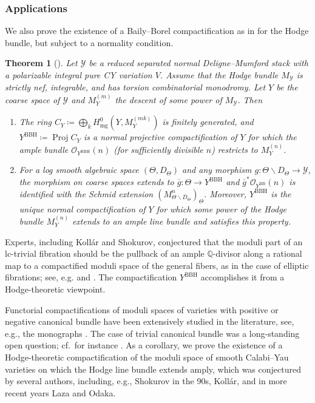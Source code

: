 \documentclass{amsart}
\newcommand{\bs}{\backslash}
\newcommand{\proj}{\operatorname{Proj}}
\newcommand{\ol}{\overline}
\newtheorem{thm}[theorem]{Theorem}
\theoremstyle{definition}
\theoremstyle{remark}
\def\bQ{\mathbb{Q}}
\def\cO{\mathcal{O}}
\def\cY{\mathcal{Y}}
\def\BB{\mathrm{BB}}
\def\bdd{\mathrm{mg}}
\renewcommand{\bar}[1]{\ol{#1}}
\def\BBH{\mathrm{BBH}}
\numberwithin{equation}{section}
\def\testsp{\Theta}
\begin{document}
\subsubsection{Applications}

We also prove the existence of a Baily--Borel compactification as in  for the Hodge bundle, but subject to a normality condition.



\begin{thm}[]\label{thm:BBHodgemain}
Let $\cY$ be a reduced separated normal Deligne--Mumford stack with a polarizable integral pure CY variation $V$.  Assume that the Hodge bundle $M_\cY$ is strictly nef, integrable, and has torsion combinatorial monodromy.  Let $Y$ be the coarse space of $\cY$ and $M_Y^{(m)}$ the descent of some power of $M_\cY$.    Then

\begin{enumerate}
\item The ring $C_Y\coloneqq  \bigoplus_k H^0_{\bdd}(Y,M^{(mk)}_Y)$ is finitely generated, and $Y^{\BBH}\coloneqq  \proj C_Y$ is a normal projective compactification of $Y$ for which the ample bundle $\cO_{Y^\BBH}(n)$ (for sufficiently divisible $n$) restricts to $M_Y^{(n)}$.
\item For a log smooth algebraic space $(\testsp,D_\testsp)$ and any morphism $g:\testsp\bs D_\testsp\to \cY$, the morphism on coarse spaces extends to $\bar g:\testsp\to Y^\BBH$ and $\bar g^*\cO_{Y^\BB}(n)$ is identified with the Schmid extension $(M_{\testsp\bs D_\testsp}^n)_\testsp$.  Moreover, $Y^\BBH$ is the unique normal compactification of $Y$ for which some power of the Hodge bundle $M_Y^{(n)}$ extends to an ample line bundle and satisfies this property. 

\end{enumerate}
\end{thm}


Experts, including Koll\'ar and Shokurov, conjectured that the moduli part of an lc-trivial fibration should be the pullback of an ample $\bQ$-divisor along a rational map to a compactified moduli space of the general fibers, as in the case of elliptic fibrations;
see, e.g. \cite[\S 8.3.8]{Koll07} and \cite{shokurov13}. 
The compactification $Y^\BBH$ accomplishes it from a Hodge-theoretic viewpoint.

Functorial compactifications of moduli spaces of varieties with positive or negative canonical bundle have been extensively studied in the literature, see, e.g., the monographs \cite{kbook, Xu2025}. The case of trivial canonical bundle was a long-standing open question; cf.~for instance \cite{KX20,Bir22, babwild,BL24}. As a corollary, we prove the existence of a Hodge-theoretic compactification of the moduli space of smooth Calabi–Yau varieties on which the Hodge line bundle extends amply, which was conjectured by several authors, including, e.g., Shokurov in the 90s, Koll\'{a}r, and in more recent years Laza and Odaka.
\end{document}
